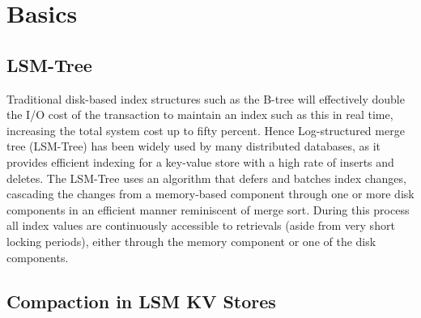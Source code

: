 \documentclass[a4paper,10pt,twoside]{article}
\begin{document}
\section{Basics}

\subsection{LSM-Tree}

Traditional disk-based index structures such as the B-tree will effectively double the I/O cost of the transaction to maintain an index such as this in real time, increasing the total system cost up to fifty percent. 
Hence Log-structured merge tree (LSM-Tree) \cite{LSM-Tree} has been widely used by many distributed databases, as it provides efficient indexing for a key-value store with a high rate of inserts and deletes.
The LSM-Tree uses an algorithm that defers and batches index changes, cascading the changes from a memory-based component through one or more disk components in an efficient manner reminiscent of merge sort. 
During this process all index values are continuously accessible to retrievals (aside from very short locking periods), either through the memory component or one of the disk components.

\subsection{Compaction in LSM KV Stores}
\end{document}
